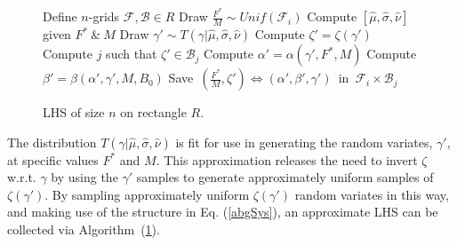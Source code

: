 \vspace{-0.25cm}
%
\begin{figure}
	\renewcommand{\baselinestretch}{1.3}
        \vspace{-1cm}
        \begin{minipage}{0.5\textwidth}
                \begin{algorithm}[H]
                        \caption{LHS of size $n$ on rectangle $R$.}
                        \label{lhsAlg}
                        \begin{algorithmic}[1]
                        \State Define $n$-grids $\mathcal{F}, \mathcal{B}\in R$
                        \State Draw $\frac{F^*}{M} \sim Unif(\mathcal{F}_i)$
                        \State Compute $[\hat\mu, \hat\sigma, \hat\nu]$ given $F^*~\&~M$
                                \State Draw $\gamma' \sim T(\gamma|\hat\mu, \hat\sigma, \hat\nu)$
                                \State Compute $\zeta' = \zeta(\gamma')$
                                \State Compute $j$ such that $\zeta'\in\mathcal{B}_j$
                        \EndWhile
                        \State Compute $\alpha' = \alpha(\gamma', F^*, M)$
                        \State Compute $\beta' = \beta(\alpha', \gamma', M, B_0)$
                        \State \mbox{Save $(\frac{F^*}{M}, \zeta')\Leftrightarrow(\alpha', \beta', \gamma')$ in $\mathcal{F}_i\times\mathcal{B}_j$}
                        \EndFor
                        \EndProcedure
                        \end{algorithmic}
                \end{algorithm}
        \end{minipage}
\end{figure}
\renewcommand{\baselinestretch}{2.5}

The distribution $T(\gamma|\hat\mu, \hat\sigma, \hat\nu)$ is fit for use in
generating the random variates, $\gamma'$, at specific values $F^*$ and $M$. 
This approximation releases the need to invert $\zeta$ w.r.t. $\gamma$ by using
the $\gamma'$ samples to generate approximately uniform samples of
$\zeta(\gamma')$. By sampling approximately uniform $\zeta(\gamma')$ random
variates in this way, and making use of the structure in Eq. (\ref{abgSys}), %
an approximate LHS can be collected via \mbox{Algorithm (\ref{lhsAlg}).} %

